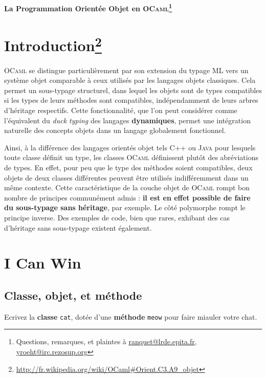 \documentclass[a4paper]{article}
\begin{document}
\begin{center}
  {\Large {\bf La Programmation Orientée Objet en
  \textsc{OCaml}\protect\footnote{Questions, remarques, et plaintes à
\url{ranquet@lrde.epita.fr}, \protect\url{yroeht@irc.rezosup.org}}}}
\end{center}

\bigskip

\section*{Introduction\protect\footnote{\url{http://fr.wikipedia.org/wiki/OCaml\#Orient.C3.A9\_objet}}}

\textsc{OCaml} se distingue particulièrement par son extension du typage
\textsc{ML} vers un système objet comparable à ceux utilisés par les langages
objets classiques.  Cela permet un sous-typage structurel, dans lequel les
objets sont de types compatibles si les types de leurs méthodes sont
compatibles, indépendamment de leurs arbres d'héritage respectifs. Cette
fonctionnalité, que l'on peut considérer comme l'équivalent du \textit{duck
typing} des langages \textbf{dynamiques}, permet une intégration naturelle des
concepts objets dans un langage globalement fonctionnel.

Ainsi, à la différence des langages orientés objet tels \textsc{C++} ou
\textsc{Java} pour lesquels toute classe définit un type, les classes
\textsc{OCaml} définissent plutôt des abréviations de types. En effet, pour peu
que le type des méthodes soient compatibles, deux objets de deux classes
différentes peuvent être utilisés indifféremment dans un même contexte. Cette
caractéristique de la couche objet de \textsc{OCaml} rompt bon nombre de
principes communément admis : \textbf{il est en effet possible de faire du
sous-typage sans héritage}, par exemple. Le côté polymorphe rompt le principe
inverse. Des exemples de code, bien que rares, exhibant des cas d'héritage sans
sous-typage existent
également.

\section{I Can Win}

\subsection{Classe, objet, et méthode}

Ecrivez la \textbf{classe} \verb|cat|, dotée d'une \textbf{méthode} \verb|meow|
pour faire miauler votre chat.
\end{document}
